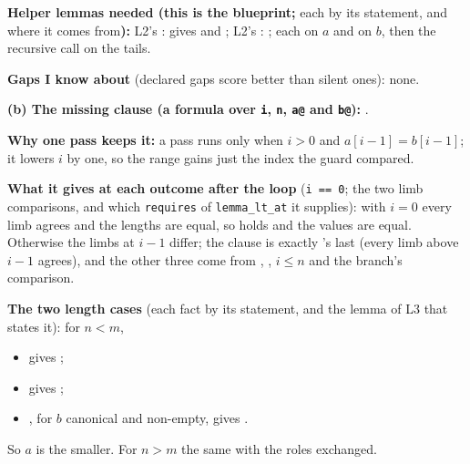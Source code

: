 \documentclass[11pt]{article}
\begin{document}
\begin{answer}
\textbf{Helper lemmas needed (this is the blueprint;} each by its statement,
and where it comes from\textbf{):} L2's : 
gives  and ; L2's
: ;
each on $a$ and on $b$, then the recursive call on the tails.

\textbf{Gaps I know about} (declared gaps score better than silent ones): none.

\textbf{(b) The missing clause (a formula over \texttt{i}, \texttt{n},
\texttt{a@} and \texttt{b@}):}
.

\textbf{Why one pass keeps it:} a pass runs only when $i > 0$ and
$a[i - 1] = b[i - 1]$; it lowers $i$ by one, so the range gains just the index
the guard compared.

\textbf{What it gives at each outcome after the loop} (\texttt{i == 0}; the
two limb comparisons, and which \texttt{requires} of \texttt{lemma\_lt\_at}
it supplies): with $i = 0$ every limb agrees and the lengths are equal, so
 holds and the values are equal. Otherwise the limbs at $i - 1$
differ; the clause is exactly 's last  (every
limb above $i - 1$ agrees), and the other three come from ,
, $i \leq n$ and the branch's comparison.

\textbf{The two length cases} (each fact by its statement, and the lemma of
L3 that states it): for $n < m$,
\begin{itemize}
\item {} gives ;
\item {} gives ;
\item {}, for $b$ canonical and non-empty,
  gives .
\end{itemize}
So $a$ is the smaller. For $n > m$ the same with the roles exchanged.
\end{answer}

\end{document}
